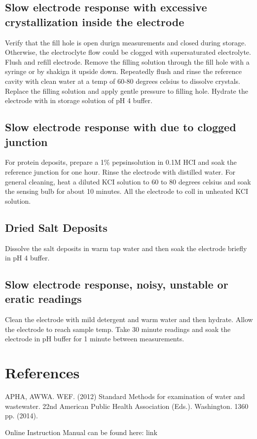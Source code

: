 \documentclass[12pt]{../SOP3_beta}\usepackage[]{graphicx}\usepackage[]{color}
\begin{document}
\subsection{Slow electrode response with excessive crystallization inside the electrode}

\NP Verify that the fill hole is open durign measurements and closed during storage. Otherwise, the electroclyte flow could be clogged with supersaturated electrolyte. Flush and refill electrode. Remove the filling solution through the fill hole with a syringe or by shakign it upside down. Repeatedly flush and rinse the reference cavity with clean water at a temp of 60-80 degrees celsius to dissolve crystals. Replace the filling solution and apply gentle pressure to filling hole. Hydrate the electrode with in storage solution of pH 4 buffer.

\subsection{Slow electrode response with due to clogged junction}

\NP For protein deposits, prepare a 1\% pepsinsolution in 0.1M HCI and soak the reference junction for one hour. Rinse the electrode with distilled water. For general cleaning, heat a diluted KCI solution to 60 to 80 degrees celsius and soak the sensing bulb for about 10 minutes. All the electrode to coll in unheated KCI solution.

\subsection{Dried Salt Deposits}

\NP Dissolve the salt deposits in warm tap water and then soak the electrode briefly in pH 4 buffer.

\subsection{Slow electrode response, noisy, unstable or eratic readings}

\NP Clean the electrode with mild detergent and warm water and then hydrate. Allow the electrode to reach sample temp. Take 30 minute readings and soak the electrode in pH buffer for 1 minute between measurements.

\section{References}

\NP APHA, AWWA. WEF. (2012) Standard Methods for examination of water and wastewater. 22nd American Public Health Association (Eds.). Washington. 1360 pp. (2014).

\NP Online Instruction Manual can be found here: link
\end{document}
